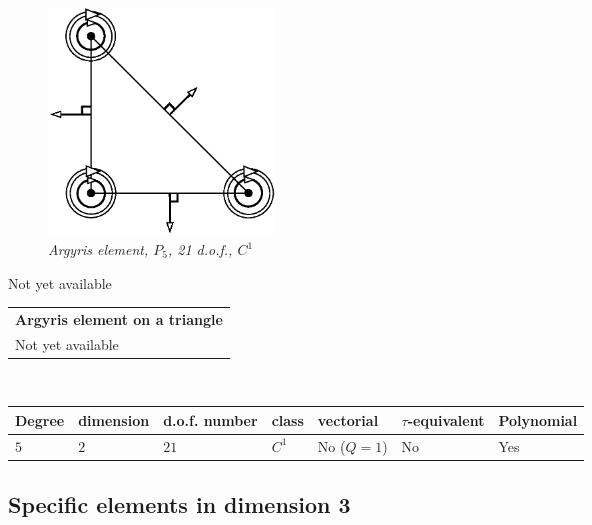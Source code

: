 \documentclass[11pt,a4paper]{article}
\begin{document}
\begin{figure}[H]
  \begin{center}
    \includegraphics[width=6cm,angle=0]{getfemlist_argyris.eps}
  \end{center}
  \caption{ \it Argyris element, $P_5$, 21 d.o.f., $C^1$}
  \label{fig:argyris}
\end{figure}
Not yet available

\begin{center}
\begin{tabular}{|m{16.11cm}|} \hline 
{ \bf Argyris element on a triangle}\\
Not yet available
\end{tabular} \\ \vspace{-1pt} 
\begin{tabular}{|m{2cm}|m{2cm}|m{2.5cm}|m{1.2cm}|m{2cm}|m{2cm}|m{1.8cm}|} \hline 
Degree & dimension & d.o.f. number & class & vectorial & \mbox{$\tau$-equivalent} & Polynomial\\ \hline
$5$ & $2$ & $21$ & $C^1$ & No \mbox{($Q = 1$)} & No & Yes\\ \hline
\end{tabular}
\end{center}

\subsection{Specific elements in dimension 3}
\end{document}
